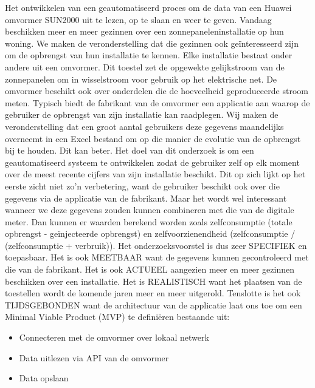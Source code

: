 \documentclass{hogent-article}
\begin{document}
    Het ontwikkelen van een geautomatiseerd proces om de data van een Huawei omvormer SUN2000 uit te lezen, op te slaan en weer te geven. Vandaag beschikken meer en meer gezinnen over een zonnepaneleninstallatie op hun woning. We maken de veronderstelling dat die gezinnen ook geïnteresseerd zijn om de opbrengst van hun installatie te kennen. Elke installatie bestaat onder andere uit een omvormer. Dit toestel zet de opgewekte gelijkstroom van de zonnepanelen om in wisselstroom voor gebruik op het elektrische net. De omvormer beschikt ook over onderdelen die de hoeveelheid geproduceerde stroom meten. Typisch biedt de fabrikant van de omvormer een applicatie aan waarop de gebruiker de opbrengst van zijn installatie kan raadplegen. Wij maken de veronderstelling dat een groot aantal gebruikers deze gegevens maandelijks overneemt in een Excel bestand om op die manier de evolutie van de opbrengst bij te houden.
    Dit kan beter. Het doel van dit onderzoek is om een geautomatiseerd systeem te ontwikkelen zodat de gebruiker zelf op elk moment over de meest recente cijfers van zijn installatie beschikt. Dit op zich lijkt op het eerste zicht niet zo'n verbetering, want de gebruiker beschikt ook over die gegevens via de applicatie van de fabrikant. Maar het wordt wel interessant wanneer we deze gegevens zouden kunnen combineren met die van de digitale meter. Dan kunnen er waarden berekend worden zoals zelfconsumptie (totale opbrengst - geïnjecteerde opbrengst) en zelfvoorzienendheid (zelfconsumptie / (zelfconsumptie + verbruik)).
    Het onderzoeksvoorstel is dus zeer SPECIFIEK en toepasbaar. Het is ook MEETBAAR want de gegevens kunnen gecontroleerd met die van de fabrikant. Het is ook ACTUEEL aangezien meer en meer gezinnen beschikken over een installatie. Het is REALISTISCH want het plaatsen van de toestellen wordt de komende jaren meer en meer uitgerold. Tenslotte is het ook TIJDSGEBONDEN want de architectuur van de applicatie laat ons toe om een Minimal Viable Product (MVP) te definiëren bestaande uit:
    \begin{itemize}
        \item Connecteren met de omvormer over lokaal netwerk
        \item Data uitlezen via API van de omvormer
        \item Data opslaan
    \end{itemize}
\end{document}
